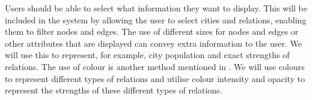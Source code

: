 Users should be able to select what information they want to display. This will be included in the system by allowing the user to select cities and relations, enabling them to filter nodes and edges. The use of different sizes for nodes and edges or other attributes that are displayed can convey extra information to the user. We will use this to represent, for example, city population and exact strengths of relations.
The use of colour is another method mentioned in \cite{468391}. We will use colours to represent different types of relations and utilise colour intensity and opacity to represent the strengths of these different types of relations.